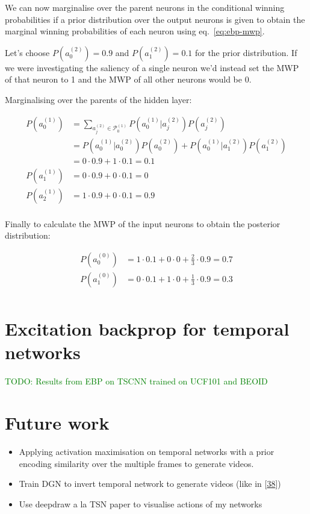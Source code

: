\documentclass[A4paper,draft]{scrreprt}
\providecommand{\tightlist}{%
  \setlength{\itemsep}{0pt}\setlength{\parskip}{0pt}}
\newcommand{\neuron}[2]{a_{#2}^{(#1)}}
\newcommand{\parents}[2]{\mathscr{P}^{(#1)}_{#2}}
\newcommand{\cwp}[4]{P\left(\neuron{#1}{#2} | \neuron{#3}{#4}\right)}
\newcommand{\mwp}[2]{P\left(\neuron{#1}{#2}\right)}
\begin{document}
We can now marginalise over the parent neurons in the conditional
winning probabilities if a prior distribution over the output neurons is
given to obtain the marginal winning probabilities of each neuron using
eq.~\ref{eq:ebp-mwp}.

Let's choose \(\mwp{2}{0} = 0.9\) and \(\mwp{2}{1} = 0.1\) for the prior
distribution. If we were investigating the saliency of a single neuron
we'd instead set the MWP of that neuron to 1 and the MWP of all other
neurons would be 0.

Marginalising over the parents of the hidden layer:

\begin{align*}
\mwp{1}{0} &= \sum_{\neuron{2}{j} \in \parents{1}{0}} \cwp{1}{0}{2}{j} \mwp{2}{j} \\
           &= \cwp{1}{0}{2}{0} \mwp{2}{0} + \cwp{1}{0}{2}{1} \mwp{2}{1} \\
           &= 0 \cdot 0.9 + 1 \cdot 0.1 = 0.1\\
\mwp{1}{1} &= 0 \cdot 0.9 + 0 \cdot 0.1 = 0\\
\mwp{1}{2} &= 1 \cdot 0.9 + 0 \cdot 0.1 = 0.9\\
\end{align*}

Finally to calculate the MWP of the input neurons to obtain the
posterior distribution:

\begin{align*}
\mwp{0}{0} &= 1 \cdot 0.1 + 0 \cdot 0 + \frac{2}{3} \cdot 0.9 = 0.7\\
\mwp{0}{1} &= 0 \cdot 0.1 + 1 \cdot 0 + \frac{1}{3} \cdot 0.9 = 0.3\\
\end{align*}

\chapter{Excitation backprop for temporal
networks}\label{sec:ebp-for-temporal-networks}

\textcolor{green}{TODO: Results from EBP on TSCNN trained on UCF101 and BEOID}\newline

\chapter{Future work}\label{sec:future-work}

\begin{itemize}
\tightlist
\item
  Applying activation maximisation on temporal networks with a prior
  encoding similarity over the multiple frames to generate videos.
\item
  Train DGN to invert temporal network to generate videos (like in
  {[}\protect\hyperlink{ref-nguyen2016_Synthesizingpreferredinputs}{38}{]})
\item
  Use deepdraw a la TSN paper to visualise actions of my networks
\end{itemize}
\end{document}
